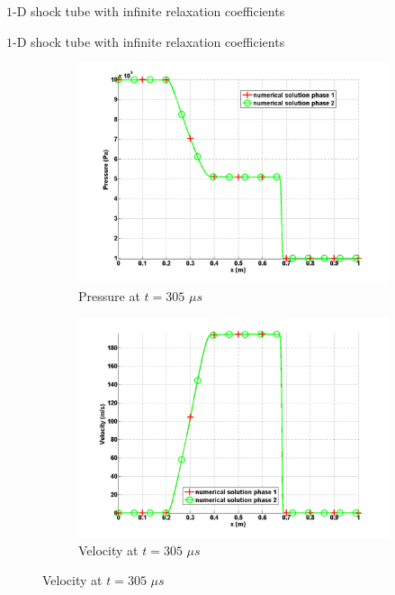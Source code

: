 \documentclass[xcolor=dvipsnames,10pt]{beamer}
\begin{document}
\begin{frame}{$1$-D shock tube with infinite relaxation coefficients}

\end{frame}
\begin{frame}{$1$-D shock tube with infinite relaxation coefficients}
\begin{figure}
        \begin{subfigure}[b]{0.37\textwidth}
                \centering
                \includegraphics[width=\textwidth]{../figures/SEM/relaxation_two_phases_pressure.png}
                \caption{Pressure at $t=305$ $\mu s$}
        \end{subfigure}%
        \begin{subfigure}[b]{0.37\textwidth}
                \centering
                \includegraphics[width=\textwidth]{../figures/SEM/relaxation_two_phases_velocity.png}
                \caption{Velocity at $t=305$ $\mu s$}
        \end{subfigure}%


\end{figure}
\end{frame}
\end{document}
